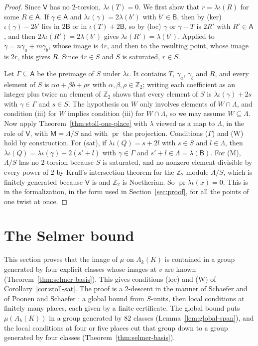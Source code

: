 \documentclass[11pt]{amsart}
\theoremstyle{definition}
\numberwithin{equation}{section}
\newcommand{\Zt}{\mathbb{Z}_2}
\newcommand{\pr}{\operatorname{pr}}
\begin{document}
\begin{proof}
Since $\mathsf V$ has no $2$-torsion, $\lambda\iota(T)=0$. We first show that $r=\lambda\iota(R)$ for some $R\in\mathsf A$. If $\gamma\in\mathsf A$ and $\lambda\iota(\gamma)=2\lambda(b')$ with $b'\in\mathsf B$, then by (ker) $\iota(\gamma)-2b'$ lies in $2\mathsf B$ or in $\iota(T)+2\mathsf B$, so by (loc) $\gamma$ or $\gamma-T$ is $2R'$ with $R'\in\mathsf A$, and then $2\lambda\iota(R')=2\lambda(b')$ gives $\lambda\iota(R')=\lambda(b')$. Applied to $\gamma=n\gamma_a+m\gamma_b$, whose image is $4r$, and then to the resulting point, whose image is $2r$, this gives $R$. Since $4r\in S$ and $S$ is saturated, $r\in S$.

Let $\Gamma\subseteq\mathsf A$ be the preimage of $S$ under $\lambda\iota$. It contains $T$, $\gamma_a$, $\gamma_b$ and $R$, and every element of $S$ is $\alpha a+\beta b+\rho r$ with $\alpha,\beta,\rho\in\Zt$; writing each coefficient as an integer plus twice an element of $\Zt$ shows that every element of $S$ is $\lambda\iota(\gamma)+2s$ with $\gamma\in\Gamma$ and $s\in S$. The hypothesis on $W$ only involves elements of $W\cap\Lambda$, and condition (iii) for $W$ implies condition (iii) for $W\cap\Lambda$, so we may assume $W\subseteq\Lambda$. Now apply Theorem~\ref{thm:stoll-one-place} with $\lambda$ viewed as a map to $\Lambda$, in the role of $\mathsf V$, with $\mathsf M=\Lambda/S$ and with $\pr$ the projection. Conditions ($\Gamma$) and (W) hold by construction. For (sat), if $\lambda\iota(Q)=s+2l$ with $s\in S$ and $l\in\Lambda$, then $\lambda\iota(Q)=\lambda\iota(\gamma)+2(s'+l)$ with $\gamma\in\Gamma$ and $s'+l\in\Lambda=\lambda(\mathsf B)$. For (M), $\Lambda/S$ has no $2$-torsion because $S$ is saturated, and no nonzero element divisible by every power of $2$ by Krull's intersection theorem for the $\Zt$-module $\Lambda/S$, which is finitely generated because $\mathsf V$ is and $\Zt$ is Noetherian. So $\pr\lambda\iota(x)=0$. This is  in the formalization, in the form used in Section~\ref{sec:proof}, for all the points of one twist at once.
\end{proof}

\section{The Selmer bound}\label{sec:selmer}

This section proves that the image of $\mu$ on $A_k(K)$ is contained in a group generated by four explicit classes whose images at $v$ are known (Theorem~\ref{thm:selmer-basis}). This gives conditions (loc) and (W) of Corollary~\ref{cor:stoll-sat}. The proof is a $2$-descent in the manner of Schaefer \cite{Schaefer95} and of Poonen and Schaefer \cite{PS97}: a global bound from $S$-units, then local conditions at finitely many places, each given by a finite certificate. The global bound puts $\mu(A_k(K))$ in a group generated by $82$ classes (Lemma~\ref{lem:global-span}), and the local conditions at four or five places cut that group down to a group generated by four classes (Theorem~\ref{thm:selmer-basis}).
\end{document}
